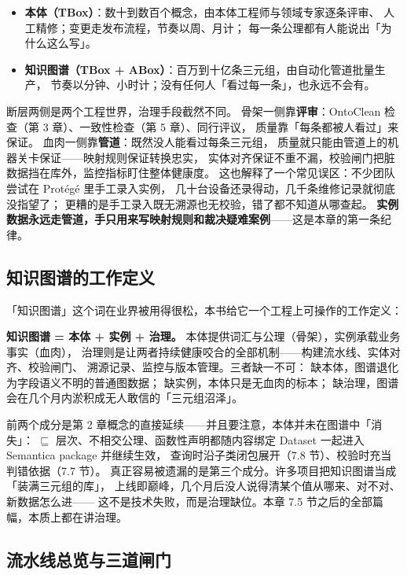 \begin{itemize}
\item \textbf{本体（TBox）}：数十到数百个概念，由本体工程师与领域专家逐条评审、
  人工精修；变更走发布流程，节奏以周、月计；
  每一条公理都有人能说出「为什么这么写」。
\item \textbf{知识图谱（TBox + ABox）}：百万到十亿条三元组，由自动化管道批量生产，
  节奏以分钟、小时计；没有任何人「看过每一条」，也永远不会有。
\end{itemize}

断层两侧是两个工程世界，治理手段截然不同。
骨架一侧靠\textbf{评审}：OntoClean 检查（第 3 章）、一致性检查（第 5 章）、同行评议，
质量靠「每条都被人看过」来保证。
血肉一侧靠\textbf{管道}：既然没人能看过每条三元组，
质量就只能由管道上的机器关卡保证——映射规则保证转换忠实，
实体对齐保证不重不漏，校验闸门把脏数据挡在库外，监控指标盯住整体健康度。
这也解释了一个常见误区：不少团队尝试在 Protégé 里手工录入实例，
几十台设备还录得动，几千条维修记录就彻底没指望了；
更糟的是手工录入既无溯源也无校验，错了都不知道从哪查起。
\textbf{实例数据永远走管道，手只用来写映射规则和裁决疑难案例}——这是本章的第一条纪律。

\subsection{知识图谱的工作定义}

「知识图谱」这个词在业界被用得很松，本书给它一个工程上可操作的工作定义：

\begin{noteblock}
\textbf{知识图谱 = 本体 + 实例 + 治理。}
本体提供词汇与公理（骨架），实例承载业务事实（血肉），
治理则是让两者持续健康咬合的全部机制——构建流水线、实体对齐、校验闸门、
溯源记录、监控与版本管理。三者缺一不可：
缺本体，图谱退化为字段语义不明的普通图数据；
缺实例，本体只是无血肉的标本；
缺治理，图谱会在几个月内淤积成无人敢信的「三元组沼泽」。
\end{noteblock}

前两个成分是第 2 章概念的直接延续——并且要注意，本体并未在图谱中「消失」：
\(\sqsubseteq\) 层次、不相交公理、函数性声明都随内容绑定 Dataset 一起进入
Semantica package 并继续生效，
查询时沿子类闭包展开（7.8 节）、校验时充当判错依据（7.7 节）。
真正容易被遗漏的是第三个成分。许多项目把知识图谱当成「装满三元组的库」，
上线即巅峰，几个月后没人说得清某个值从哪来、对不对、新数据怎么进——
这不是技术失败，而是治理缺位。本章 7.5 节之后的全部篇幅，本质上都在讲治理。

\subsection{流水线总览与三道闸门}

